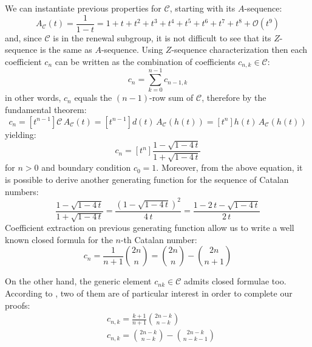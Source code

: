We can instantiate previous properties for $\mathcal{C}$, starting with its $A$-sequence:
\begin{displaymath}
    A_{\mathcal{C}}(t)=\frac{1}{1-t}=1+t+t^{2}+t^{3}+t^{4}+t^{5}+t^{6}+t^{7}+t^{8}+
        \mathcal{O}(t^{9})
\end{displaymath}
and, since $\mathcal{C}$ is in the renewal subgroup, it is not difficult to see that its
$Z$-sequence is the same as $A$-sequence. Using $Z$-sequence characterization then 
each coefficient $c_{n}$ can be written as the combination of coefficients $c_{n,k}\in\mathcal{C}$:
\begin{displaymath}
    c_{n} = \sum_{k=0}^{n-1}{c_{n-1,k}}
\end{displaymath}
in other words, $c_{n}$ equals the $(n-1)$-row sum of $\mathcal{C}$, 
therefore by the fundamental theorem:
\begin{displaymath}
    c_{n} = [t^{n-1}]\mathcal{C}\,A_{\mathcal{C}}(t)
          = [t^{n-1}]d(t)\,A_{\mathcal{C}}(h(t))
          = [t^{n}]h(t)\,A_{\mathcal{C}}(h(t))
\end{displaymath}
yielding:
\begin{displaymath}
    c_{n} = [t^{n}]\frac{1-\sqrt{1-4 \, t}}{1+\sqrt{1-4 \, t}}
\end{displaymath}
for $n>0$ and boundary condition $c_{0}=1$. 
Moreover, from the above equation, it is possible to derive
another generating function for the sequence of Catalan numbers:
\begin{displaymath}
    \frac{1-\sqrt{1-4 \, t}}{1+\sqrt{1-4 \, t}}=
    \frac{\left(1-\sqrt{1-4 \, t}\right)^{2}}{4 \, t}=
    \frac{1-2\,t-\sqrt{1-4 \, t}}{2 \, t}
\end{displaymath}
Coefficient extraction on previous generating function allow us to write 
a well known closed formula for the $n$-th Catalan number:
\begin{equation}
    c_{n} = \frac{1}{n+1}{{2n}\choose{n}} 
        = {{2n}\choose{n}} - {{2n}\choose{n+1}}
    \label{eq:catalan:coeff:rewriting}
\end{equation}

On the other hand, the generic element $c_{nk}\in\mathcal{C}$ 
admits closed formulae too. According to
\cite{luzon:2012631}, two of them are of
particular interest in order to complete our proofs:
\begin{eqnarray}
    & c_{n,k}=\frac{k+1}{n+1}{{2n-k}\choose{n-k}}
    \label{eq:catalan:array:first:identity}\\
    & c_{n,k}={{2n-k}\choose{n-k}} - {{2n-k}\choose{n-k-1}}
    \label{eq:catalan:array:second:identity}
\end{eqnarray}


